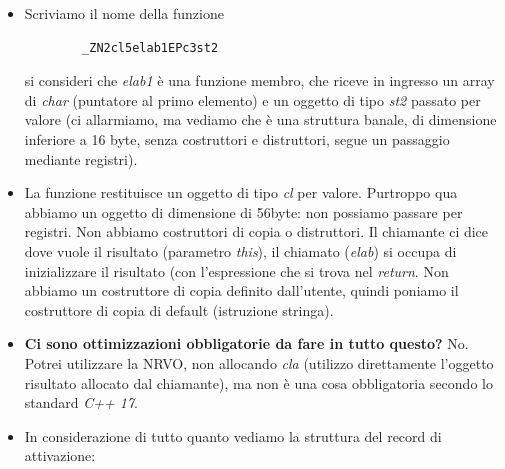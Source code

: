 \begin{itemize}
	\item Scriviamo il nome della funzione
	\begin{verbatim}
		_ZN2cl5elab1EPc3st2
	\end{verbatim}
	si consideri che \emph{elab1} è una funzione membro, che riceve in ingresso un array di \emph{char} (puntatore al primo elemento) e un oggetto di tipo \emph{st2} passato per valore (ci allarmiamo, ma vediamo che è una struttura banale, di dimensione inferiore a 16 byte, senza costruttori e distruttori, segue un passaggio mediante registri). 
	\item La funzione restituisce un oggetto di tipo \emph{cl} per valore. Purtroppo qua abbiamo un oggetto di dimensione di 56byte: non possiamo passare per registri. Non abbiamo costruttori di copia o distruttori. Il chiamante ci dice dove vuole il risultato (parametro \emph{this}), il chiamato (\emph{elab}) si occupa di inizializzare il risultato (con l'espressione che si trova nel \emph{return}. Non abbiamo un costruttore di copia definito dall'utente, quindi poniamo il costruttore di copia di default (istruzione stringa).
	\item \textbf{Ci sono ottimizzazioni obbligatorie da fare in tutto questo?} No. Potrei utilizzare la NRVO, non allocando \emph{cla} (utilizzo direttamente l'oggetto risultato allocato dal chiamante), ma non è una cosa obbligatoria secondo lo standard \emph{C++ 17}.
	\item In considerazione di tutto quanto vediamo la struttura del record di attivazione:\begin{center}

\end{center}
\end{itemize}
